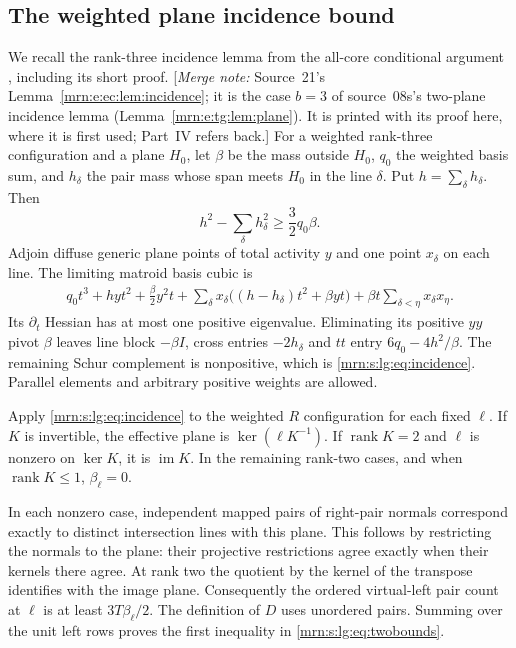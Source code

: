 \documentclass[11pt,a4paper]{article}
\theoremstyle{remark}\newtheorem{remark}[theorem]{Remark}
\newcommand{\rk}{\operatorname{rank}}      %
\newcommand{\mnote}[1]{[\textit{Merge note:} #1]}
\begin{document}
\subsection{The weighted plane incidence bound}
We recall the rank-three incidence lemma from the all-core conditional argument \cite{b:m21}, including its short proof. \mnote{Source~21's Lemma~\ref{mrn:e:ec:lem:incidence}; it is the case $b=3$ of source~08s's two-plane incidence lemma (Lemma~\ref{mrn:e:tg:lem:plane}). It is printed with its proof here, where it is first used; Part~IV refers back.} For a weighted rank-three configuration and a plane $H_0$, let $\beta$ be the mass outside $H_0$, $q_0$ the weighted basis sum, and $h_\delta$ the pair mass whose span meets $H_0$ in the line $\delta$. Put $h=\sum_\delta h_\delta$. Then
\begin{equation}\label{mrn:s:lg:eq:incidence}
 h^2-\sum_\delta h_\delta^2\ge\frac32q_0\beta.
\end{equation}
Adjoin diffuse generic plane points of total activity $y$ and one point $x_\delta$ on each line. The limiting matroid basis cubic is
\begin{align*}
 q_0t^3+hyt^2+\frac{\beta}{2}y^2t
 +\sum_\delta x_\delta\bigl((h-h_\delta)t^2+\beta yt\bigr)
 +\beta t\sum_{\delta<\eta}x_\delta x_\eta.
\end{align*}
Its $\partial_t$ Hessian has at most one positive eigenvalue. Eliminating its positive $yy$ pivot $\beta$ leaves line block $-\beta I$, cross entries $-2h_\delta$ and $tt$ entry $6q_0-4h^2/\beta$. The remaining Schur complement is nonpositive, which is \eqref{mrn:s:lg:eq:incidence}. Parallel elements and arbitrary positive weights are allowed.

Apply \eqref{mrn:s:lg:eq:incidence} to the weighted $R$ configuration for each fixed $\ell$. If $K$ is invertible, the effective plane is $\ker(\ell K^{-1})$. If $\rk K=2$ and $\ell$ is nonzero on $\ker K$, it is $\operatorname{im}K$. In the remaining rank-two cases, and when $\rk K\le1$, $\beta_\ell=0$.

In each nonzero case, independent mapped pairs of right-pair normals correspond exactly to distinct intersection lines with this plane. This follows by restricting the normals to the plane: their projective restrictions agree exactly when their kernels there agree. At rank two the quotient by the kernel of the transpose identifies with the image plane. Consequently the ordered virtual-left pair count at $\ell$ is at least $3T\beta_\ell/2$. The definition of $D$ uses unordered pairs. Summing over the unit left rows proves the first inequality in \eqref{mrn:s:lg:eq:twobounds}.
\end{document}
